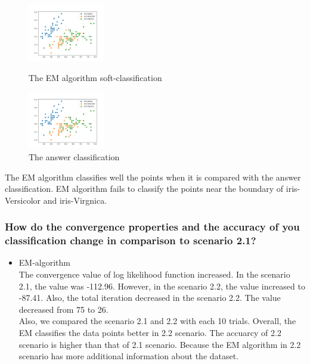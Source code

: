 \documentclass[a4paper]{article}
\begin{document}
\begin{itemize}
		\begin{figure}[h]
			\begin{center}
				\includegraphics[width=0.3\textwidth]{4class.png}
				\caption{The EM algorithm soft-classification}
				\includegraphics[width=0.3\textwidth]{4_answer.png}
				\caption{The answer classification}
			\end{center}
		\end{figure}
		
		The EM algorithm classifies well the points when it is compared with the answer classification. EM algorithm fails to classify the points near the boundary of iris-Versicolor and iris-Virgnica.
		
	\end{itemize}
	\subsubsection{How do the convergence properties and the accuracy of you classiﬁcation change in comparison to scenario 2.1? }
	\begin{itemize}
		\item EM-algorithm \\
		The convergence value of log likelihood function increased. In the scenario 2.1, the value was -112.96. However, in the scenario 2.2, the value increased to -87.41. Also, the total iteration decreased in the scenario 2.2. The value decreased from 75 to 26.\\
		Also, we compared the scenario 2.1 and 2.2 with each 10 trials. Overall, the EM classifies the data points better in 2.2 scenario. The accuarcy of 2.2 scenario is higher than that of 2.1 scenario. Because the EM algorithm in 2.2 scenario has more additional information about the dataset.
		 
	\end{itemize}
	
\end{document}
